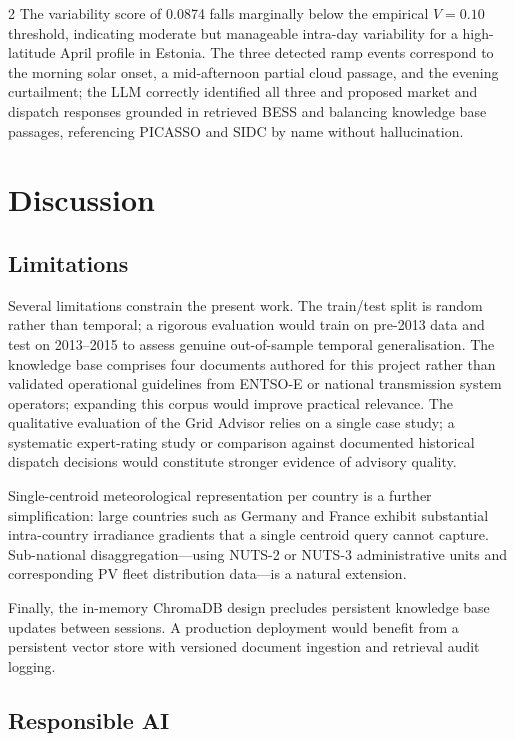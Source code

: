 \documentclass[11pt]{article}
\begin{document}
\begin{multicols}{2}
The variability score of 0.0874 falls marginally below the empirical
$V = 0.10$ threshold, indicating moderate but manageable intra-day variability
for a high-latitude April profile in Estonia. The three detected ramp events
correspond to the morning solar onset, a mid-afternoon partial cloud passage,
and the evening curtailment; the LLM correctly identified all three and
proposed market and dispatch responses grounded in retrieved BESS and balancing
knowledge base passages, referencing PICASSO and SIDC by name without
hallucination.

\newpage
\section{Discussion}

\subsection{Limitations}

Several limitations constrain the present work. The train/test split is random
rather than temporal; a rigorous evaluation would train on pre-2013 data and
test on 2013--2015 to assess genuine out-of-sample temporal generalisation.
The knowledge base comprises four documents authored for this project rather
than validated operational guidelines from ENTSO-E or national transmission
system operators; expanding this corpus would improve practical relevance.
The qualitative evaluation of the Grid Advisor relies on a single case study;
a systematic expert-rating study or comparison against documented historical
dispatch decisions would constitute stronger evidence of advisory quality.

Single-centroid meteorological representation per country is a further
simplification: large countries such as Germany and France exhibit substantial
intra-country irradiance gradients that a single centroid query cannot capture.
Sub-national disaggregation---using NUTS-2 or NUTS-3 administrative units and
corresponding PV fleet distribution data---is a natural extension.

Finally, the in-memory ChromaDB design precludes persistent knowledge base
updates between sessions. A production deployment would benefit from a
persistent vector store with versioned document ingestion and retrieval
audit logging.

\subsection{Responsible AI}


\end{multicols}
\end{document}
